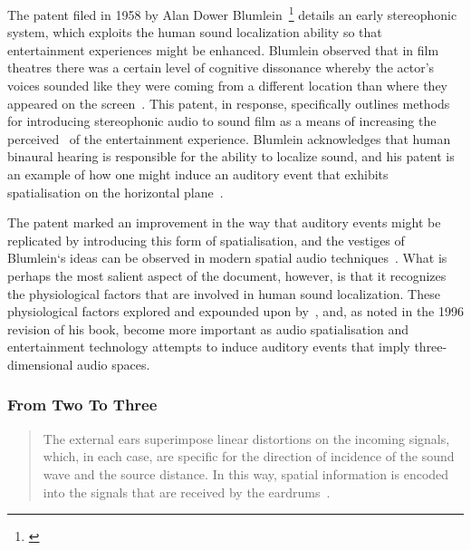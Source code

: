 The patent filed in 1958 by Alan Dower Blumlein~\footnote{\citep{blumlein-patent}} details an early stereophonic system, which exploits the human sound localization ability so that entertainment experiences might be enhanced.
Blumlein observed that in film theatres there was a certain level of cognitive dissonance whereby the actor’s voices sounded like they were coming from a different location than where they appeared on the screen~\citep{alexander_blumlein}.
This patent, in response, specifically outlines methods for introducing stereophonic audio to sound film as a means of increasing the perceived~ of the entertainment experience.
Blumlein acknowledges that human binaural hearing is responsible for the ability to localize sound, and his patent is an example of how one might induce an auditory event that exhibits spatialisation on the horizontal plane~\citep{blumlein-patent}.


The patent marked an improvement in the way that auditory events might be replicated by introducing this form of spatialisation, and the vestiges of Blumlein`s ideas can be observed in modern spatial audio techniques~\citep{spatial_techniques, beyer_acoustics}.
What is perhaps the most salient aspect of the document, however, is that it recognizes the physiological factors that are involved in human sound localization.
These physiological factors explored and expounded upon by~\citet{blauert_spatial}, and, as noted in the 1996 revision of his book, become more important as audio spatialisation and entertainment technology attempts to induce auditory events that imply three-dimensional audio spaces.

\subsubsection{From Two To Three}

\begin{quotation}
    The external ears superimpose linear distortions on the incoming signals, which, in each case, are specific for the direction of incidence of the sound wave and the source distance.
    In this way, spatial information is encoded into the signals that are received by the eardrums~\citep{blauert_spatial}.
\end{quotation}